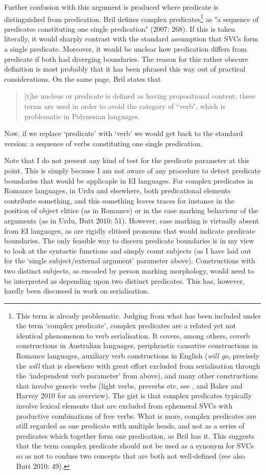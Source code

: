 Further confusion with this argument is produced where predicate is distinguished from predication. Bril defines complex predicates\footnote{This term is already problematic. Judging from what has been included under the term `complex predicate', complex predicates are a related yet not identical phenomenon to verb serialisation. It covers, among others, coverb constructions in Australian languages, periphrastic causative constructions in Romance languages, auxiliary verb constructions in English (\textit{will go}, precisely the \textit{will} that is elsewhere with great effort excluded from serialisation through the `independent verb parameter' from above), and many other constructions that involve generic verbs (light verbs, preverbs etc, see \cite{alsina1997complex}, and Baker and Harvey 2010 for an overview). The gist is that complex predicates typically involve lexical elements that are excluded from ephemeral SVCs with productive combinations of free verbs. What is more, complex predicates are still regarded as one predicate with multiple heads, and not as a series of predicates which together form one predication, as Bril has it. This suggests that the term complex predicate should not be used as a synonym for SVCs so as not to confuse two concepts that are both not well-defined (see also Butt 2010: 49).} as "a sequence of predicates constituting one single predication" (2007: 268). If this is taken literally, it would sharply contrast with the standard assumption that SVCs form a single predicate. Moreover, it would be unclear how predication differs from predicate if both had diverging boundaries. The reason for this rather obscure definition is most probably that it has been phrased this way out of practical considerations. On the same page, Bril states that \begin{quote}[t]he nucleus or predicate is defined as having propositional content; these terms are used in order to avoid the category of ``verb", which is problematic in Polynesian languages.\end{quote} Now, if we replace `predicate' with `verb' we would get back to the standard version: a sequence of verbs constituting one single predication. 

Note that I do not present any kind of test for the predicate parameter at this point. This is simply because I am not aware of any procedure to detect predicate boundaries that would be applicaple in EI languages. For complex predicates in Romance languages, in Urdu and elsewhere, both predicational elements contribute something, and this something leaves traces for instance in the position of object clitics (as in Romance) or in the case marking behaviour of the arguments (as in Urdu, Butt 2010: 51). However, case marking is virtually absent from EI languages, as are rigidly clitised pronouns that would indicate predicate boundaries. The only feasible way to discern predicate boundaries is in my view to look at the syntactic functions and simply count subjects (as I have laid out for the `single subject/external argument' parameter above). Constructions with two distinct subjects, as encoded by person marking morphology, would need to be interpreted as depending upon two distinct predicates. This has, however, hardly been discussed in work on serialisation.

